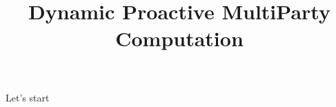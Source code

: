\documentclass[runningheads]{llncs}
\title{Dynamic Proactive MultiParty Computation}
\begin{document}
	\maketitle
	Let's start
	
\end{document}
